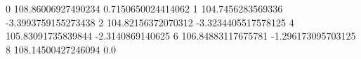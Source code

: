 0 108.86006927490234 0.7150650024414062
1 104.7456283569336 -3.3993759155273438
2 104.82156372070312 -3.3234405517578125
4 105.83091735839844 -2.3140869140625
6 106.84883117675781 -1.296173095703125
8 108.14500427246094 0.0
